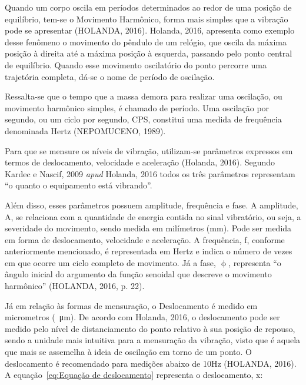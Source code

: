 \documentclass[
	12pt,				
	oneside,			
	a4paper,			
	english,			
	brazil,			
	]{abntex2ppgsi}
\begin{document}
Quando um corpo oscila em períodos determinados ao redor de uma posição de equilíbrio, tem-se o Movimento Harmônico, forma mais simples que a vibração pode se apresentar (HOLANDA, 2016). Holanda, 2016, apresenta como exemplo desse fenômeno o movimento do pêndulo de um relógio, que oscila da máxima posição à direita até a máxima posição à esquerda, passando pelo ponto central de equilíbrio. Quando esse movimento oscilatório do ponto percorre uma trajetória completa, dá-se o nome de período de oscilação.  

Ressalta-se que o tempo que a massa demora para realizar uma oscilação, ou movimento harmônico simples, é chamado de período. Uma oscilação por segundo, ou um ciclo por segundo, CPS, constitui uma medida de frequência denominada Hertz (NEPOMUCENO, 1989). 



Para que se mensure os níveis de vibração, utilizam-se parâmetros expressos em termos de deslocamento, velocidade e aceleração (Holanda, 2016). Segundo Kardec e Nascif, 2009 \textit{apud} Holanda, 2016 todos os três parâmetros representam “o quanto o equipamento está vibrando”. 

Além disso, esses parâmetros possuem amplitude, frequência e fase. A amplitude, A, se relaciona com a quantidade de energia contida no sinal vibratório, ou seja, a severidade do movimento, sendo medida em milímetros (mm). Pode ser medida em forma de deslocamento, velocidade e aceleração. A frequência, f, conforme anteriormente mencionado, é representada em Hertz e indica o número de vezes em que ocorre um ciclo completo de movimento. Já a fase, $\upphi$, representa “o ângulo inicial do argumento da função senoidal que descreve o movimento harmônico” (HOLANDA, 2016, p. 22).

Já em relação às formas de mensuração, o Deslocamento é medido em micrometros (\SI{}{\micro\metre}). De acordo com Holanda, 2016, o deslocamento pode ser medido pelo nível de distanciamento do ponto relativo à sua posição de repouso, sendo a unidade mais intuitiva para a mensuração da vibração, visto que é aquela que mais se assemelha à ideia de oscilação em torno de um ponto. O deslocamento é recomendado para medições abaixo de 10Hz (HOLANDA, 2016). A equação~\ref{eq:Equação de deslocamento} representa o deslocamento, x:
\end{document}
